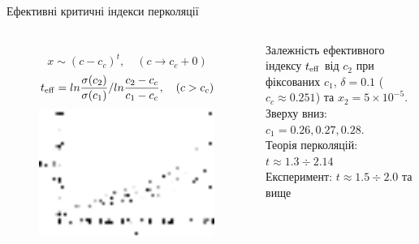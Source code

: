\documentclass[10pt]{beamer}
\begin{document}
\begin{frame}{Ефективні критичні індекси перколяції}
\footnotesize

\vspace{-15pt}
\begin{columns}[T,onlytextwidth]
      \begin{figure}
        \centering
        $$x \sim (c-c_c)^t, \quad (c \to c_c+0)$$
        $$t_{\rm eff} = ln \frac{\sigma(c_2)}{\sigma(c_1)} / ln \frac{c_2-c_c}{c_1 - c_c}, \quad (c>c_c)$$
        \includegraphics[width=0.99\textwidth]{images/teff.eps}
      \end{figure}
        Залежність ефективного індексу $t_{\rm eff}$ від $c_2$ при фіксованих $c_1$, $\delta=0.1$ ($c_c \approx 0.251$) та $x_2 = 5\times 10^{-5}$. Зверху вниз: $c_1 = 0.26, 0.27, 0.28$.\\
        Теорія перколяцій: $t \approx 1.3 \div 2.14$\\
        Експеримент: $t\approx 1.5 \div 2.0$ та вище


\end{columns}
\end{frame}
\end{document}
